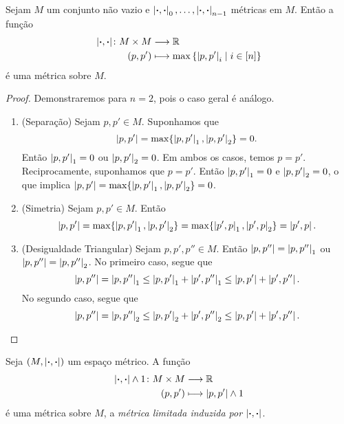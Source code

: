 \begin{proposition}
Sejam $M$ um conjunto não vazio e $\dist{\var}{\var}_0, \ldots,\dist{\var}{\var}_{n-1}$ métricas em $M$. Então a função
	\begin{align*}
	\func{\dist{\var}{\var}}{M \times M}{\R}{(p,p')}{\max\set{\dist{p}{p'}_i}{i \in [n]}}
	\end{align*}
é uma métrica sobre $M$.
\end{proposition}
\begin{proof}
Demonstraremos para $n=2$, pois o caso geral é análogo.
	\begin{enumerate}
	\item (Separação) Sejam $p,p' \in M$. Suponhamos que
	\begin{equation*}
	\dist{p}{p'}=\max\{\dist{p}{p'}_1,\dist{p}{p'}_2\}=0.
	\end{equation*}
Então $\dist{p}{p'}_1=0$ ou $\dist{p}{p'}_2=0$. Em ambos os casos, temos $p=p'$. Reciprocamente, suponhamos que $p=p'$. Então $\dist{p}{p'}_1=0$ e $\dist{p}{p'}_2=0$, o que implica $\dist{p}{p'}=\max\{\dist{p}{p'}_1,\dist{p}{p'}_2\}=0$.

	\item (Simetria) Sejam $p,p' \in M$. Então
	\begin{equation*}
	\dist{p}{p'} = \max\{\dist{p}{p'}_1,\dist{p}{p'}_2\} = \max\{\dist{p'}{p}_1,\dist{p'}{p}_2\} = \dist{p'}{p}.
	\end{equation*}

	\item (Desigualdade Triangular) Sejam $p,p',p'' \in M$. Então $\dist{p}{p''}=\dist{p}{p''}_1$ ou $\dist{p}{p''}=\dist{p}{p''}_2$. No primeiro caso, segue que
	\begin{equation*}
	\dist{p}{p''} = \dist{p}{p''}_1 \leq \dist{p}{p'}_1 + \dist{p'}{p''}_1 \leq \dist{p}{p'} + \dist{p'}{p''}.
	\end{equation*}
	No segundo caso, segue que
	\begin{equation*}
	\dist{p}{p''} = \dist{p}{p''}_2 \leq \dist{p}{p'}_2 + \dist{p'}{p''}_2 \leq \dist{p}{p'} + \dist{p'}{p''}. \qedhere
	\end{equation*}
	\end{enumerate}
\end{proof}

\begin{exercise}
Seja $(M,\dist{\var}{\var})$ um espaço métrico. A função
	\begin{align*}
	\func{\dist{\var}{\var} \opmin 1}{M \times M}{\R}{(p,p')}{\dist{p}{p'} \opmin 1}
	\end{align*}
é uma métrica sobre $M$, a \emph{métrica limitada induzida por $\dist{\var}{\var}$}.
\end{exercise}

